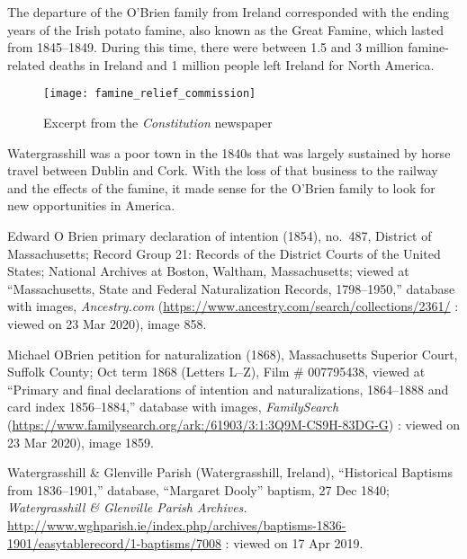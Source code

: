 {{The departure of the O'Brien family from Ireland corresponded with the ending years of the Irish potato famine, also known as the Great Famine, which lasted from 1845--1849. During this time, there were between 1.5 and 3 million famine-related deaths in Ireland and 1 million people left Ireland for North America.\cite{Smith:469}

\begin{figure}
	\centering
	\texttt{[image: famine\_relief\_commission]}
	\caption{Excerpt from the \textit{Constitution} newspaper}
	\label{fig:FamineRelief}
\end{figure}

Watergrasshill was a poor town in the 1840s that was largely sustained by horse travel between Dublin and Cork. With the loss of that business to the railway and the effects of the famine, it made sense for the O'Brien family to look for new opportunities in America.

\begin{thebibliography}{999}


Edward O Brien primary declaration of intention (1854), no.\ 487, 
District of Massachusetts; 
Record Group 21: Records of the District Courts of the United States; 
National Archives at Boston, Waltham, Massachusetts;
viewed at ``Massachusetts, State and Federal Naturalization Records, 1798--1950,''
database with images, \textit{Ancestry.com} (\url{https://www.ancestry.com/search/collections/2361/} : viewed on 23 Mar 2020), image 858.

Michael OBrien petition for naturalization (1868), 
Massachusetts Superior Court, Suffolk County; 
Oct term 1868 (Letters L--Z), Film \# 007795438,
viewed at ``Primary and final declarations of intention and naturalizations, 1864--1888 and card index 1856--1884,''
database with images, \textit{FamilySearch} (\url{https://www.familysearch.org/ark:/61903/3:1:3Q9M-CS9H-83DG-G}) : viewed on 23 Mar 2020), image 1859.

Watergrasshill \& Glenville Parish (Watergrasshill, Ireland), ``Historical Baptisms from 1836--1901,'' database, ``Margaret Dooly'' baptism, 27 Dec 1840; \textit{Watergrasshill \& Glenville Parish Archives.} \url{http://www.wghparish.ie/index.php/archives/baptisms-1836-1901/easytablerecord/1-baptisms/7008} : viewed on 17 Apr 2019.


\end{thebibliography}}}
